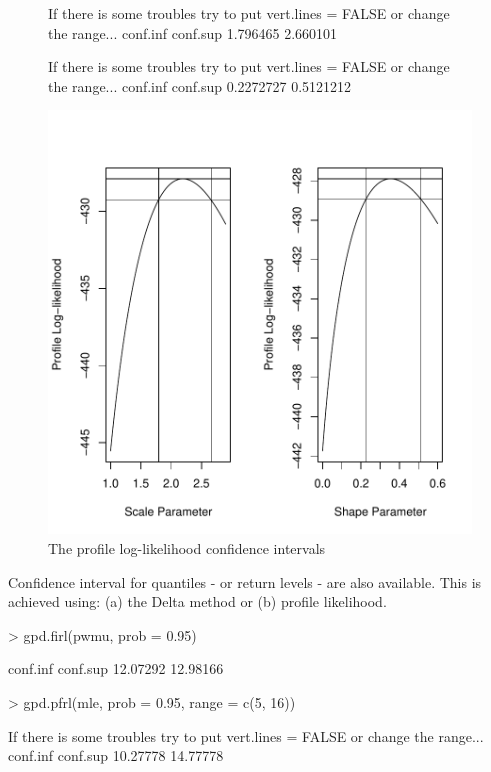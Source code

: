 \documentclass[a4paper]{article}
\numberwithin{equation}{section}
\theoremstyle{definition}
\begin{document}
\begin{figure}
\centering
\begin{Schunk}
\begin{Soutput}
If there is some troubles try to put vert.lines = FALSE or change
 the range...
conf.inf conf.sup 
1.796465 2.660101 
\end{Soutput}
\begin{Soutput}
If there is some troubles try to put vert.lines = FALSE or change
 the range...
 conf.inf  conf.sup 
0.2272727 0.5121212 
\end{Soutput}
\end{Schunk}
\includegraphics{guide-023}
\caption{The profile log-likelihood confidence intervals}
\label{fig:pfci}
\end{figure}

Confidence interval for quantiles - or return levels - are also
available. This is achieved using: (a) the Delta method or (b) profile
likelihood.
\begin{Schunk}
\begin{Sinput}
> gpd.firl(pwmu, prob = 0.95)
\end{Sinput}
\begin{Soutput}
conf.inf conf.sup 
12.07292 12.98166 
\end{Soutput}
\begin{Sinput}
> gpd.pfrl(mle, prob = 0.95, range = c(5, 16))
\end{Sinput}
\begin{Soutput}
If there is some troubles try to put vert.lines = FALSE or change
 the range...
conf.inf conf.sup 
10.27778 14.77778 
\end{Soutput}
\end{Schunk}
\end{document}
